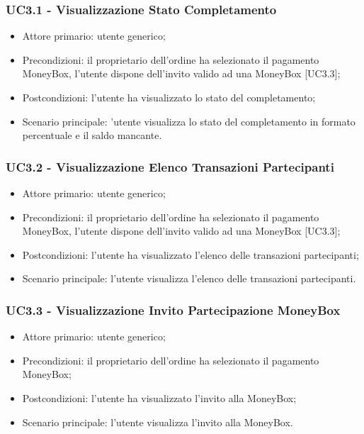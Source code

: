 \subsubsection{UC3.1 - Visualizzazione Stato Completamento}

\begin{itemize}
    \item Attore primario: utente generico;
    \item Precondizioni: il proprietario dell'ordine ha selezionato il pagamento MoneyBox\glo [UC2.2.2], 
            l'utente dispone dell'invito valido ad una MoneyBox\glo{} [UC3.3];
    \item Postcondizioni: l'utente ha visualizzato lo stato del completamento;
    \item Scenario principale: 'utente visualizza lo stato del completamento in formato percentuale e il saldo mancante.
\end{itemize}

\subsubsection{UC3.2 - Visualizzazione Elenco Transazioni Partecipanti}

\begin{itemize}
    \item Attore primario: utente generico;
    \item Precondizioni: il proprietario dell'ordine ha selezionato il pagamento MoneyBox\glo [UC2.2.2], 
            l'utente dispone dell'invito valido ad una MoneyBox\glo{} [UC3.3];
    \item Postcondizioni: l'utente ha visualizzato l'elenco delle transazioni partecipanti;
    \item Scenario principale: l'utente visualizza l'elenco delle transazioni partecipanti.
\end{itemize}

\subsubsection{UC3.3 - Visualizzazione Invito Partecipazione MoneyBox}

\begin{itemize}
    \item Attore primario: utente generico;
    \item Precondizioni: il proprietario dell'ordine ha selezionato il pagamento MoneyBox\glo [UC2.2.2];
    \item Postcondizioni: l'utente ha visualizzato l'invito alla MoneyBox\glo{};
    \item Scenario principale: l'utente visualizza l'invito alla MoneyBox\glo{}.
\end{itemize}

